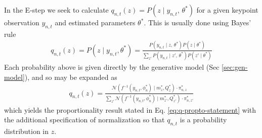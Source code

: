 \documentclass{article}         %
\newcommand{\NN}{\mathcal{N}}
\begin{document}
In the E-step we seek to calculate $q_{n, t}(z) = P(z\mid y_{n, t},\,\theta^*)$ for a given keypoint observation $y_{n, t}$ and estimated parameters $\theta^*$. This is usually done using Bayes' rule
\begin{align}
    q_{n,t}(z) = P(z\mid y_{n, t}, \theta^*) = \frac{P(y_{n, t}\mid z,\,\theta^*)P(z\mid \theta^*)}{\sum_{z'} P(y_{n, t}\mid z',\,\theta^*)P(z'\mid \theta^*)}
\end{align}
Each probability above is given directly by the generative model (Sec \ref{sec:gen-model}), and so may be expanded as
\begin{align}
    q_{n,t}(z) = \frac{ \NN(f^{-1}(y_{n,t}, \phi^*_n) \mid m_{z}^*, Q_{z}^*) \cdot \pi_{n,z}^* }{ \sum_{z'} \NN(f^{-1}(y_{n,t}, \phi^*_n) \mid m_{z'}^*, Q_{z'}^*) \cdot \pi_{n,z'}^* }
\end{align}
which yields the proportionality result stated in Eq. \ref{eq:q-propto-statement} with the additional specification of normalization so that $q_{n,t}$ is a probability distribution in $z$.
\end{document}

